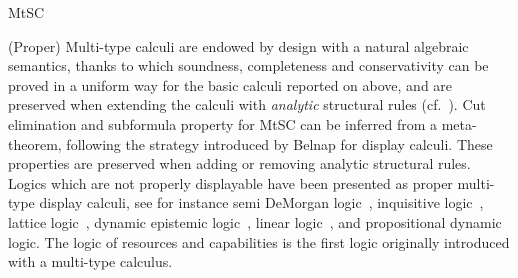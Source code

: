 \begin{entry}{MtSC}
\begin{technicalities}
  (Proper) Multi-type calculi are endowed by design with a natural algebraic
  semantics, thanks to which soundness, completeness and conservativity can be
  proved in a uniform way for the basic calculi reported on above, and are
  preserved when extending the calculi with {\em analytic} structural rules
  (cf.~\cite[Definition 4]{GrecoMaPalmigianoTzimoulisZhao2016}).
  Cut elimination and subformula property for MtSC can be inferred from a
  meta-theorem, following the strategy introduced by Belnap for display calculi.
  These properties are preserved when adding or removing analytic structural
  rules. Logics which are not properly displayable have been presented as proper
  multi-type display calculi, see for instance semi DeMorgan logic~,
  inquisitive logic~, lattice logic~, dynamic
  epistemic logic~, linear logic~\cite{GrecoPalmigiano}, and
  propositional dynamic logic. %
  The logic of resources and capabilities %
  is the first logic originally introduced with a multi-type calculus.
\end{technicalities}

\end{entry}
